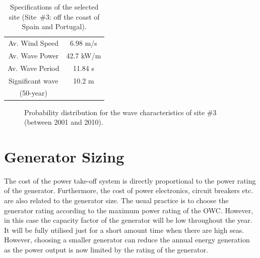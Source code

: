 \documentclass[twocolumn]{article}
\begin{document}
\begin{table}
  \centering
  \begin{tabular}{cc}
    \hline
Av. Wind Speed & 6.98 m/s \\
Av. Wave Power & 42.7 kW/m \\
Av. Wave Period & 11.84 s \\
Significant wave & 10.2 m  \\
(50-year) \\
\hline
  \end{tabular}
  \caption{Specifications of the selected site (Site~\#3: off the coast of Spain and Portugal)\cite{Gao2012}.}
  \label{site_spec}
\end{table}

\begin{figure}[t]
  \centering

    \caption{Probability distribution for the wave characteristics of site \#3 (between 2001 and 2010).} 
    \label{spain_site}
\end{figure} 

\section{Generator Sizing}

The cost of the power take-off system is directly proportional to the power rating of the generator. Furthermore, the cost of power electronics, circuit breakers etc. are also related to the generator size. The usual practice is to choose the generator rating according to the maximum power rating of the OWC. However, in this case the capacity factor of the generator will be low throughout the year. It will be fully utilised just for a short amount time when there are high seas. However, choosing a smaller generator can reduce the annual energy generation as the power output is now limited by the rating of the generator.
\end{document}
